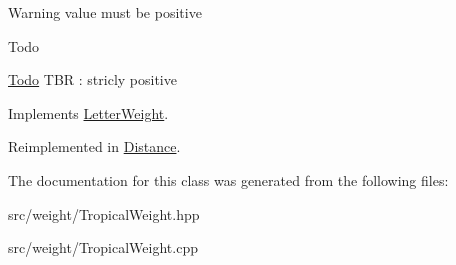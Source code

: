 \begin{DoxyWarning}{Warning}
value must be positive
\end{DoxyWarning}
\begin{DoxyRefDesc}{Todo}
\item[\mbox{\hyperlink{todo__todo000038}{Todo}}]T\+BR \+: stricly positive \end{DoxyRefDesc}


Implements \mbox{\hyperlink{classLetterWeight_af1f898e0845f59299440fc50a58fd2f1}{Letter\+Weight}}.



Reimplemented in \mbox{\hyperlink{classDistance_a1fe45f762afff378c46f81d6199a14ab}{Distance}}.



The documentation for this class was generated from the following files\+:\begin{DoxyCompactItemize}
\item 
src/weight/Tropical\+Weight.\+hpp\item 
src/weight/Tropical\+Weight.\+cpp\end{DoxyCompactItemize}
